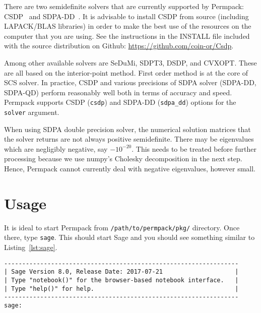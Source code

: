 There are two semidefinite solvers that are currently supported by Permpack: CSDP~\cite{csdp} and SDPA-DD~\cite{sdpa}. It is advisable to install CSDP from source (including LAPACK/BLAS libraries) in order to make the best use of the resources on the computer that you are using. See the instructions in the INSTALL file included with the source distribution on Github: \url{https://github.com/coin-or/Csdp}.

Among other available solvers are SeDuMi, SDPT3, DSDP, and CVXOPT. These are all based on the interior-point method. First order method is at the core of SCS solver. In practice, CSDP and various precisions of SDPA solver (SDPA-DD, SDPA-QD) perform reasonably well both in terms of accuracy and speed. Permpack supports CSDP (\texttt{csdp}) and SDPA-DD (\texttt{sdpa\_dd}) options for the \texttt{solver} argument.

\begin{note}
When using SDPA double precision solver, the numerical solution matrices that the solver returns are not always positive semidefinite. There may be eigenvalues which are negligibly negative, say $-10^{-20}$. This needs to be treated before further processing because we use numpy's Cholesky decomposition in the next step. Hence, Permpack cannot currently deal with negative eigenvalues, however small.
\end{note}

\section{Usage}
\label{sec:permpack-usage}

It is ideal to start Permpack from \texttt{/path/to/permpack/pkg/} directory. Once there, type \texttt{sage}. This should start Sage and you should see something similar to Listing~\ref{lst:sage}.
 {}
\begin{lstlisting}
-----------------------------------------------------------------
| Sage Version 8.0, Release Date: 2017-07-21                    |
| Type "notebook()" for the browser-based notebook interface.   |
| Type "help()" for help.                                       |
-----------------------------------------------------------------
sage:
\end{lstlisting}

